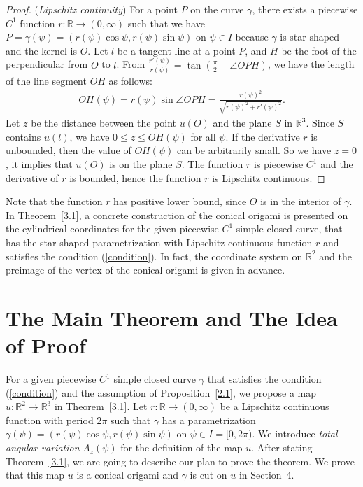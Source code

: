 \documentclass{amsart}
\theoremstyle{plain}
\theoremstyle{definition}
\theoremstyle{remark}
\begin{document}
\begin{proof}
(\emph{Lipschitz continuity})
For a point $P$ on the curve $\gamma$, there exists a piecewise $C^1$ function $r \colon \mathbb{R}\to(0,\infty)$ such that we have $P=\gamma(\psi)=(r(\psi)\cos\psi,r(\psi)\sin\psi)$ on $\psi\in I$ because $\gamma$ is star-shaped and the kernel is $O$.
Let $l$ be a tangent line at a point $P$, and $H$ be the foot of the perpendicular from $O$ to $l$.
From $\frac{r'(\psi)}{r(\psi)}=\tan\left(\frac{\pi}2-\angle OPH\right)$, we have the length of the line segment $OH$ as follows:
\begin{align*}
OH(\psi)=r(\psi)\sin\angle OPH=\frac{r(\psi)^2}{\sqrt{r(\psi)^2+r'(\psi)^2}}.
\end{align*}
Let $z$ be the distance between the point $u(O)$ and the plane $S$ in $\mathbb{R}^3$.
Since $S$ contains $u(l)$, we have $0\le z\le OH(\psi)$ for all $\psi$.
If the derivative $r$ is unbounded, then the value of $OH(\psi)$ can be arbitrarily small.
So we have $z=0$, it implies that $u(O)$ is on the plane $S$.
The function $r$ is piecewise $C^1$ and the derivative of $r$ is bounded, hence the function $r$ is Lipschitz continuous.
\end{proof}

Note that the function $r$ has positive lower bound, since $O$ is in the interior of $\gamma$.
In Theorem~\ref{3.1}, a concrete construction of the conical origami is presented on the cylindrical coordinates for the given piecewise $C^1$ simple closed curve, that has the star shaped parametrization with Lipschitz continuous function $r$ and satisfies the condition (\ref{condition}).
In fact, the coordinate system on $\mathbb{R}^2$ and the preimage of the vertex of the conical origami is given in advance.









\bigskip



\section{The Main Theorem and The Idea of Proof}%
For a given piecewise $C^1$ simple closed curve $\gamma$ that satisfies the condition (\ref{condition}) and the assumption of 
Proposition~\ref{2.1}, we propose a map $u \colon \mathbb{R}^2\to\mathbb{R}^3$ in Theorem~\ref{3.1}.
Let $r \colon \mathbb{R}\to(0,\infty)$ be a Lipschitz continuous function with period $2\pi$ such that $\gamma$ has a parametrization $\gamma(\psi)=(r(\psi)\cos\psi,r(\psi)\sin\psi)$ on $\psi\in I=[0,2\pi)$.
We introduce \emph{total angular variation} $A_z(\psi)$ for the definition of the map $u$.
After stating Theorem~\ref{3.1}, we are going to describe our plan to prove the theorem.  
We prove that this map $u$ is a conical origami and $\gamma$ is cut on $u$ in Section~4.
\end{document}
